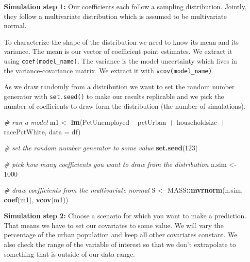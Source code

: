 \documentclass[]{article}
\newenvironment{Shaded}{\begin{snugshade}}{\end{snugshade}}
\newcommand{\CommentTok}[1]{\textcolor[rgb]{0.56,0.35,0.01}{\textit{#1}}}
\newcommand{\DataTypeTok}[1]{\textcolor[rgb]{0.13,0.29,0.53}{#1}}
\newcommand{\DecValTok}[1]{\textcolor[rgb]{0.00,0.00,0.81}{#1}}
\newcommand{\KeywordTok}[1]{\textcolor[rgb]{0.13,0.29,0.53}{\textbf{#1}}}
\newcommand{\NormalTok}[1]{#1}
\newcommand{\OperatorTok}[1]{\textcolor[rgb]{0.81,0.36,0.00}{\textbf{#1}}}
\newcommand{\StringTok}[1]{\textcolor[rgb]{0.31,0.60,0.02}{#1}}
\begin{document}
\textbf{Simulation step 1:} Our coefficients each follow a sampling distribution. Jointly, they follow a multivariate distribution which is assumed to be multivariate normal.

To characterize the shape of the distribution we need to know its mean and its variance. The mean is our vector of coefficient point estimates. We extract it using \texttt{coef(model\_name)}. The variance is the model uncertainty which lives in the variance-covariance matrix. We extract it with \texttt{vcov(model\_name)}.

As we draw randomly from a distribution we want to set the random number generator with \texttt{set.seed()} to make our results replicable and we pick the number of coefficients to draw form the distribution (the number of simulations).

\begin{Shaded}
\begin{Highlighting}[]
\CommentTok{# run a model}
\NormalTok{m1 <-}\StringTok{ }\KeywordTok{lm}\NormalTok{(PctUnemployed }\OperatorTok{~}\StringTok{ }\NormalTok{pctUrban }\OperatorTok{+}\StringTok{ }\NormalTok{householdsize }\OperatorTok{+}\StringTok{ }\NormalTok{racePctWhite, }\DataTypeTok{data =}\NormalTok{ df)}

\CommentTok{# set the random number generator to some value}
\KeywordTok{set.seed}\NormalTok{(}\DecValTok{123}\NormalTok{)}

\CommentTok{# pick how many coefficients you want to draw from the distribution}
\NormalTok{n.sim <-}\StringTok{ }\DecValTok{1000}

\CommentTok{# draw coefficients from the multivariate normal}
\NormalTok{S <-}\StringTok{ }\NormalTok{MASS}\OperatorTok{::}\KeywordTok{mvrnorm}\NormalTok{(n.sim, }\KeywordTok{coef}\NormalTok{(m1), }\KeywordTok{vcov}\NormalTok{(m1))}
\end{Highlighting}
\end{Shaded}

\textbf{Simulation step 2:} Choose a scenario for which you want to make a prediction. That means we have to set our covariates to some value. We will vary the percentage of the urban population and keep all other covariates constant. We also check the range of the variable of interest so that we don't extrapolate to something that is outside of our data range.
\end{document}
